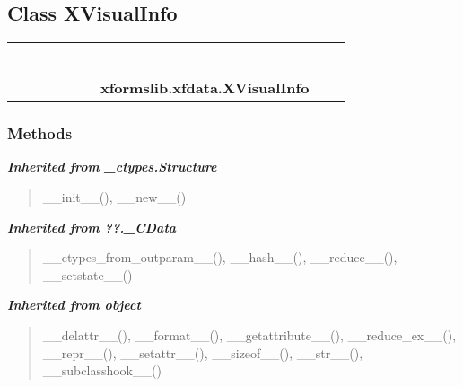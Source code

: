 \subsection{Class XVisualInfo}

    \label{xformslib:xfdata:XVisualInfo}
\begin{tabular}{cccccccccc}
\multicolumn{2}{r}{\settowidth{\BCL}{object}\multirow{2}{\BCL}{object}}
&&
&&
&&
  \\\cline{3-3}
  &&\multicolumn{1}{c|}{}
&&
&&
&&
  \\
\multicolumn{4}{r}{\settowidth{\BCL}{??.\_CData}\multirow{2}{\BCL}{??.\_CData}}
&&
&&
  \\\cline{5-5}
  &&&&\multicolumn{1}{c|}{}
&&
&&
  \\
\multicolumn{6}{r}{\settowidth{\BCL}{\_ctypes.Structure}\multirow{2}{\BCL}{\_ctypes.Structure}}
&&
  \\\cline{7-7}
  &&&&&&\multicolumn{1}{c|}{}
&&
  \\
&&&&&&\multicolumn{2}{l}{\textbf{xformslib.xfdata.XVisualInfo}}
\end{tabular}



  \subsubsection{Methods}


\large{\textbf{\textit{Inherited from \_ctypes.Structure}}}

\begin{quote}
\_\_init\_\_(), \_\_new\_\_()
\end{quote}

\large{\textbf{\textit{Inherited from ??.\_CData}}}

\begin{quote}
\_\_ctypes\_from\_outparam\_\_(), \_\_hash\_\_(), \_\_reduce\_\_(), \_\_setstate\_\_()
\end{quote}

\large{\textbf{\textit{Inherited from object}}}

\begin{quote}
\_\_delattr\_\_(), \_\_format\_\_(), \_\_getattribute\_\_(), \_\_reduce\_ex\_\_(), \_\_repr\_\_(), \_\_setattr\_\_(), \_\_sizeof\_\_(), \_\_str\_\_(), \_\_subclasshook\_\_()
\end{quote}

